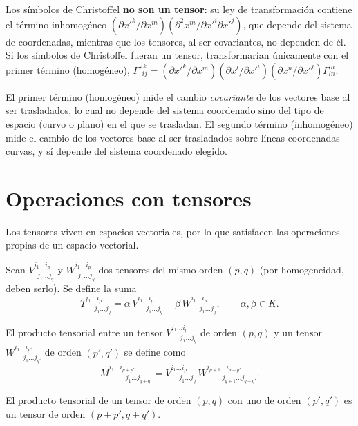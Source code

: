 \begin{observacion}
Los símbolos de Christoffel \textbf{no son un tensor}: su ley de
transformación contiene el término inhomogéneo
$(\partial x'^k/\partial x^m)(\partial^2 x^m/\partial x'^i\partial
x'^j)$, que depende del sistema de coordenadas, mientras que los
tensores, al ser covariantes, no dependen de él. Si los símbolos de
Christoffel fueran un tensor, transformarían únicamente con el primer
término (homogéneo),
$\Gamma'^{\,k}_{ij}=(\partial x'^k/\partial x^m)(\partial x^l/\partial
x'^i)(\partial x^n/\partial x'^j)\Gamma^m_{ln}$.

El primer término (homogéneo) mide el cambio \emph{covariante} de los
vectores base al ser trasladados, lo cual no depende del sistema
coordenado sino del tipo de espacio (curvo o plano) en el que se
trasladan. El segundo término (inhomogéneo) mide el cambio de los
vectores base al ser trasladados sobre líneas coordenadas curvas, y sí
depende del sistema coordenado elegido.
\end{observacion}

\section{Operaciones con tensores}

Los tensores viven en espacios vectoriales, por lo que satisfacen las
operaciones propias de un espacio vectorial.

\begin{definicion}[Suma]
Sean $V^{i_1\dots i_p}_{\ \ j_1\dots j_q}$ y $W^{i_1\dots
i_p}_{\ \ j_1\dots j_q}$ dos tensores del mismo orden $(p,q)$ (por
homogeneidad, deben serlo). Se define la suma
\[
T^{i_1\dots i_p}_{\quad\ j_1\dots j_q} = \alpha\, V^{i_1\dots
i_p}_{\quad\ j_1\dots j_q} + \beta\, W^{i_1\dots i_p}_{\quad\ j_1\dots
j_q}, \qquad \alpha,\beta\in K.
\]
\end{definicion}

\begin{definicion}
El producto tensorial entre un tensor $V^{i_1\dots
i_p}_{\quad\ j_1\dots j_q}$ de orden $(p,q)$ y un tensor $W^{i_1\dots
i_{p'}}_{\quad\ j_1\dots j_{q'}}$ de orden $(p',q')$ se define como
\[
M^{i_1\dots i_{p+p'}}_{\quad\quad\ \ j_1\dots j_{q+q'}} = V^{i_1\dots
i_p}_{\quad\ j_1\dots j_q}\, W^{i_{p+1}\dots i_{p+p'}}_{\quad\quad\
j_{q+1}\dots j_{q+q'}} .
\]
\end{definicion}

\begin{proposicionc}
El producto tensorial de un tensor de orden $(p,q)$ con uno de orden
$(p',q')$ es un tensor de orden $(p+p',q+q')$.
\end{proposicionc}

